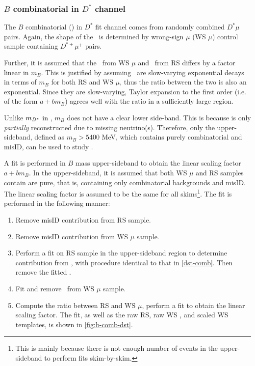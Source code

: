 \subsubsection{$B$ combinatorial in $D^*$ channel}
\label{b-comb-dst}

The $B$ combinatorial (\BComb) in $D^*$ fit channel comes from randomly
combined $D^* \mu$ pairs.
Again, the shape of the \BComb\ is determined by wrong-sign $\mu$ (WS $\mu$)
control sample containing $D^{*+} \mu^+$ pairs.

Further, it is assumed that the \BComb\ from WS $\mu$ and \BComb\ from RS
differs by a factor linear in $m_B$.
This is justified by assuming \BComb\ are slow-varying exponential decays in
terms of $m_B$ for both RS and WS $\mu$, thus the ratio between the two is also
an exponential.
Since they are slow-varying, Taylor expansion to the first order (i.e. of the
form $a + b m_B$) agrees well with the ratio in a sufficiently large region.

Unlike $m_{{D}^*}$ in \DstComb,
$m_B$ does not have a clear lower side-band.
This is because \B is only \emph{partially} reconstructed
due to missing neutrino(s).
Therefore, only the upper-sideband, defined as $m_B > 5400$ MeV,
which contains purely combinatorial and misID, can be used to
study \BComb.

A fit is performed in $B$ mass upper-sideband  to obtain
the linear scaling factor $a + b m_B$.
In the upper-sideband, it is assumed that both WS $\mu$ and RS samples contain
are pure, that is, containing only combinatorial backgrounds and misID.
The linear scaling factor is assumed to be the same for all skims\footnote{
    This is mainly because there is not enough number of events in the
    upper-sideband to perform fits skim-by-skim.
}.
The fit is performed in the following manner:

\begin{enumerate}
    \item Remove misID contribution from RS sample.
    \item Remove misID contribution from WS $\mu$ sample.
    \item Perform a fit on RS sample in the upper-sideband region to determine
        contribution from \DstComb, with procedure identical to that in
        \cref{dst-comb}.
        Then remove the fitted \DstComb.
    \item Fit and remove \DstComb\ from WS $\mu$ sample.
    \item Compute the ratio between RS and WS $\mu$, perform a fit to obtain
        the linear scaling factor.
        The fit,
        as well as the raw RS, raw WS \muon, and scaled WS \muon templates,
        is shown in \cref{fig:b-comb-dst}.
\end{enumerate}

